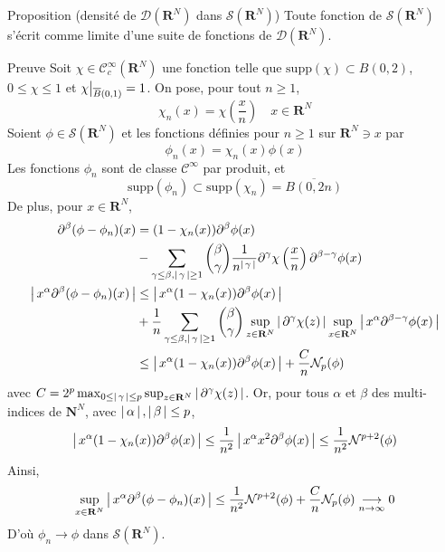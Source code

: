         \begin{omed}{Proposition (densité de $\mathcal{D}(\mathbf{R}^N)$ dans $\mathcal{S}(\mathbf{R}^N)$)}
            Toute fonction de $\mathcal{S}(\mathbf{R}^N)$ s’écrit comme limite d’une suite de fonctions de $\mathcal{D}(\mathbf{R}^N)$.
        \end{omed}

        \begin{demo}{Preuve}
            Soit $\chi \in \mathcal{C}_c^{\infty}(\mathbf{R}^N)$ une fonction telle que $\text{supp}(\chi) \subset B(0,2)$, $0 \leq \chi \leq 1$ et $\chi \big|\vphantom{|}_{\overline{B}(0,1)} = 1$. On pose, pour tout $n \geq 1$, 
            \[ \chi_n(x) = \chi\left(\frac{x}{n}\right) \quad x \in \mathbf{R}^N \]   
            Soient $\phi \in \mathcal{S}(\mathbf{R}^N)$ et les fonctions définies pour $n \geq 1$ sur $\mathbf{R}^N \ni x$ par 
            \[ \phi_n(x) = \chi_n(x) \phi(x) \]
            Les fonctions $\phi_n$ sont de classe $\mathcal{C}^{\infty}$ par produit, et 
            \[ \text{supp}(\phi_n) \subset \text{supp}(\chi_n) = \overline{B(0,2n)} \]   
            De plus, pour $x \in \mathbf{R}^N$,
            \begin{align*}
                \partial^{\beta}(\phi - \phi_n)(x) 
                &= (1 - \chi_n(x)) \partial^{\beta} \phi(x) \\
                &- \sum_{\gamma \leq \beta, \left\lvert \, \gamma \, \right\rvert \geq 1} \binom{\beta}{\gamma} \frac{1}{n^{\left\lvert \, \gamma \, \right\rvert}} \partial^{\gamma} \chi\left(\frac{x}{n}\right)\partial^{\beta - \gamma} \phi(x) \\
                \left\lvert \, x^{\alpha} \partial^{\beta}(\phi - \phi_n)(x) \, \right\rvert 
                &\leq \left\lvert \, x^{\alpha}(1 - \chi_n(x)) \partial^{\beta} \phi(x) \, \right\rvert \\
                &+ \frac{1}{n} \sum_{\gamma \leq \beta, \left\lvert \, \gamma \, \right\rvert \geq 1} \binom{\beta}{\gamma} \sup_{z \in \mathbf{R}^N} \left\lvert \, \partial^{\gamma} \chi(z) \, \right\rvert \sup_{x \in \mathbf{R}^N} \left\lvert \, x^{\alpha} \partial^{\beta - \gamma} \phi(x) \, \right\rvert \\
                &\leq \left\lvert \, x^{\alpha}(1 - \chi_n(x)) \partial^{\beta} \phi(x) \, \right\rvert + \frac{C}{n} \mathcal{N}_p(\phi) \\
            \end{align*}
            avec $C = 2^p \max_{0 \leq \left\lvert \, \gamma \, \right\rvert \leq p} \sup_{z \in \mathbf{R}^N} \left\lvert \, \partial^{\gamma} \chi(z) \, \right\rvert$. Or, pour tous $\alpha$ et $\beta$ des multi-indices de $\mathbf{N}^N$, avec $\left\lvert \, \alpha \, \right\rvert, \left\lvert \, \beta \, \right\rvert \leq p$, 
            \[ \left\lvert \, x^{\alpha}(1 - \chi_n(x))\partial^{\beta}\phi(x) \, \right\rvert \leq \frac{1}{n^2} \left\lvert \, x^{\alpha} x^2 \partial^{\beta}\phi(x) \, \right\rvert \leq \frac{1}{n^2} \mathcal{N}^{p+2}(\phi) \]    
            Ainsi, 
            \[ \sup_{x \in \mathbf{R}^N} \left\lvert \, x^{\alpha} \partial^{\beta}(\phi - \phi_n)(x) \, \right\rvert \leq \frac{1}{n^2} \mathcal{N}^{p+2}(\phi) + \frac{C}{n} \mathcal{N}_p(\phi) \underset{n \to \infty}{\longrightarrow} 0 \]
            D’où $\phi_n \to \phi$ dans $\mathcal{S}(\mathbf{R}^N)$.
        \end{demo}

